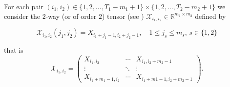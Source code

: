 \documentclass{article}
\begin{document}
For each pair $(i_1,i_2)\in\{1,2,\ldots,T_1-m_1+1\}\times\{1,2,\ldots,T_2-m_2+1\}$ we consider the $2$-way (or of order $2$) tensor (see \cite{Kolda(2009)}) $\mathcal{X}_{i_1,i_2}\in\mathbb{R}^{m_1\times m_2}$ defined by 

\begin{equation}\label{eq2}
    \mathcal{X}_{i_1,i_2}(j_1,j_2) = X_{i_1+j_1-1,i_2+j_2-1}, \quad 1\leq j_s\leq m_s,\,s\in\{1,2\}
\end{equation}

that is 
\begin{equation*}
\mathcal{X}_{i_1,i_2} = \left(\begin{array}{ccc}
        X_{i_1, i_2} & \cdots & X_{i_1, i_2 + m_2 - 1}\\
        \vdots & \ddots & \vdots\\
        X_{i_1 + m_1 - 1, i_2} & \cdots & X_{i_1 + m1 - 1, i_2 + m_2 - 1}
\end{array}\right).
\end{equation*}





\end{document}

